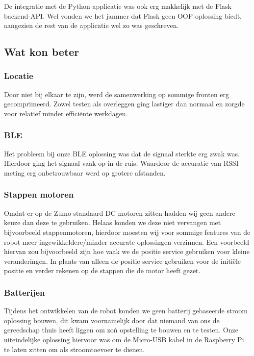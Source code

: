 De integratie met de Python applicatie was ook erg makkelijk met de Flask backend-API. Wel vonden we het jammer dat Flask geen OOP oplossing biedt, aangezien de rest van de applicatie wel zo was geschreven.

\subsection{Wat kon beter}

\subsubsection*{Locatie}

Door niet bij elkaar te zijn, werd de samenwerking op sommige fronten erg gecomprimeerd. Zowel testen als overleggen ging lastiger dan normaal en zorgde voor relatief minder efficiënte werkdagen.

\subsubsection*{BLE}

Het probleem bij onze BLE oplossing was dat de signaal sterkte erg zwak was. Hierdoor ging het signaal vaak op in de ruis. Waardoor de accuratie van RSSI meting erg onbetrouwbaar werd op grotere afstanden. 

\subsubsection*{Stappen motoren}

Omdat er op de Zumo standaard DC motoren zitten hadden wij geen andere keuze dan deze te gebruiken. Helaas konden we deze niet vervangen met bijvoorbeeld stappenmotoren, hierdoor moesten wij voor sommige features van de robot meer ingewikkeldere/minder accurate oplossingen verzinnen. Een voorbeeld hiervan zou bijvoorbeeld zijn hoe vaak we de positie service gebruiken voor kleine veranderingen. In plaats van alleen de positie service gebruiken voor de initiële positie en verder rekenen op de stappen die de motor heeft gezet.

\subsubsection*{Batterijen}

Tijdens het ontwikkelen van de robot konden we geen batterij gebaseerde stroom oplossing bouwen, dit kwam voornamelijk door dat niemand van ons de gereedschap thuis heeft liggen om zo\'n opstelling te bouwen en te testen. Onze uiteindelijke oplossing hiervoor was om de Micro-USB kabel in de Raspberry Pi te laten zitten om als stroomtoevoer te dienen.\\

